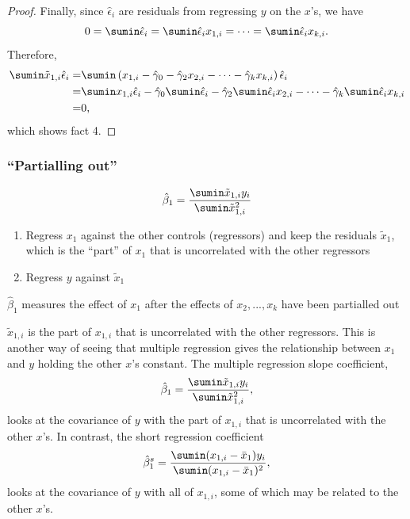 \begin{proof}
  Finally, since $\hat{\epsilon}_i$ are residuals from regressing $y$
  on the $x$'s, we have
  \[ 0 = \sumin \hat{\epsilon}_i = \sumin \hat{\epsilon}_i x_{1,i} =
  \cdots = \sumin \hat{\epsilon}_i x_{k,i}. \]
  Therefore,
  \begin{align*}
    \sumin \tilde{x}_{1,i} \hat{\epsilon}_{i} 
    = & \sumin \left(x_{1,i} - \hat{\gamma}_0 - \hat{\gamma}_2 x_{2,i} - \cdots -
        \hat{\gamma}_k x_{k,i} \right) \hat{\epsilon}_i \\
    = & \sumin x_{1,i} \hat{\epsilon}_i  - \hat{\gamma}_0 \sumin
        \hat{\epsilon}_i- \hat{\gamma}_2 \sumin
        \hat{\epsilon}_i x_{2,i} - \cdots -
        \hat{\gamma}_k \sumin
        \hat{\epsilon}_i x_{k,i} \\
    = & 0,
  \end{align*}
  which shows fact 4.
\end{proof}

\begin{frame}\frametitle{``Partialling out''}
  \[ \hat{\beta}_1 = \frac{\sumin \tilde{x}_{1,i} y_i}{\sumin
    \tilde{x}_{1,i}^2} \]
  \begin{enumerate}
  \item Regress $x_1$ against the other controls (regressors) and keep
    the residuals $\tilde{x}_1$, which is the ``part'' of $x_1$ that
    is uncorrelated with the other regressors
  \item Regress $y$ against $\tilde{x}_1$
  \end{enumerate}
  $\hat{\beta}_1$ measures the effect of $x_1$ after the effects of
  $x_2, ... , x_k$ have been partialled out

\end{frame}
$\tilde{x}_{1,i}$ is the part of $x_{1,i}$ that is uncorrelated with
the other regressors. This is another way of seeing that multiple
regression gives the relationship between $x_1$ and $y$ holding the
other $x$'s constant. The multiple regression slope coefficient, 
\[ \hat{\beta}_1 = \frac{\sumin \tilde{x}_{1,i} y_i}{\sumin
    \tilde{x}_{1,i}^2}, \]
looks at the covariance of $y$ with the part of $x_{1,i}$ that is
uncorrelated with the other $x$'s. In contrast, the short regression
coefficient
\[ \hat{\beta}^s_1 = \frac{\sumin (x_{1,i} - \bar{x}_1) y_i}{\sumin
    (x_{1,i} - \bar{x}_1)^2}, \]
looks at the covariance of $y$ with all of $x_{1,i}$, some of which
may be related to the other $x$'s. 


